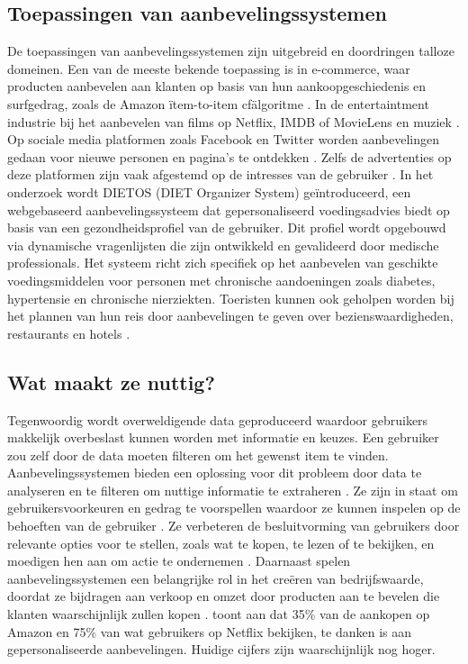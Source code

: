 \subsection{Toepassingen van aanbevelingssystemen}
De toepassingen van aanbevelingssystemen zijn uitgebreid en doordringen talloze domeinen. Een van de meeste bekende toepassing is in e-commerce, waar producten aanbevelen aan klanten op basis van hun aankoopgeschiedenis en surfgedrag, zoals de Amazon \"item-to-item \ac{cf}\" algoritme \autocite{Patel2023, Patel2020}.
In de entertaintment industrie bij het aanbevelen van films op Netflix, IMDB of MovieLens en muziek \autocite{Patel2020, Roy2022}. Op sociale media platformen zoals Facebook en Twitter worden aanbevelingen gedaan voor nieuwe personen en pagina's te ontdekken \autocite{Patel2023}. Zelfs de advertenties op deze platformen zijn vaak afgestemd op de intresses van de gebruiker \autocite{Patel2020}.
In het onderzoek \textcite{Agapito2016} wordt DIETOS (DIET Organizer System) geïntroduceerd, een webgebaseerd aanbevelingssysteem dat gepersonaliseerd voedingsadvies biedt op basis van een gezondheidsprofiel van de gebruiker. Dit profiel wordt opgebouwd via dynamische vragenlijsten die zijn ontwikkeld en gevalideerd door medische professionals. Het systeem richt zich specifiek op het aanbevelen van geschikte voedingsmiddelen voor personen met chronische aandoeningen zoals diabetes, hypertensie en chronische nierziekten. Toeristen kunnen ook geholpen worden bij het plannen van hun reis door aanbevelingen te geven over bezienswaardigheden, restaurants en hotels \autocite{Roy2022, Patel2023}.
\subsection{Wat maakt ze nuttig?}
Tegenwoordig wordt overweldigende data geproduceerd waardoor gebruikers makkelijk overbeslast kunnen worden met informatie en keuzes. Een gebruiker zou zelf door de data moeten filteren om het gewenst item te vinden. Aanbevelingssystemen bieden een oplossing voor dit probleem door data te analyseren en te filteren om nuttige informatie te extraheren \autocite{Fkih2022}. Ze zijn in staat om gebruikersvoorkeuren en gedrag te voorspellen waardoor ze kunnen inspelen op de behoeften van de gebruiker \autocite{Mazeh2020}. Ze verbeteren de besluitvorming van gebruikers door relevante opties voor te stellen, zoals wat te kopen, te lezen of te bekijken, en moedigen hen aan om actie te ondernemen \autocite{Mazeh2020}. Daarnaast spelen aanbevelingssystemen een belangrijke rol in het creëren van bedrijfswaarde, doordat ze bijdragen aan verkoop en omzet door producten aan te bevelen die klanten waarschijnlijk zullen kopen \autocite{Wang2018, Patel2023}. \autocite{MacKenzie2013} toont aan dat 35\% van de aankopen op Amazon en 75\% van wat gebruikers op Netflix bekijken, te danken is aan gepersonaliseerde aanbevelingen. Huidige cijfers zijn waarschijnlijk nog hoger.

